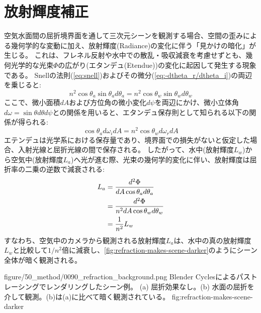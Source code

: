 \section{放射輝度補正}\label{sec:color-correction}


空気水面間の屈折境界面を通して三次元シーンを観測する場合、空間の歪みによる幾何学的な変動に加え、放射輝度(Radiance)の変化に伴う「見かけの暗化」が生じる。
これは、フレネル反射や水中での散乱・吸収減衰を考慮せずとも、幾何光学的な光束$\Phi$の広がり(エタンデュ(Etendue))の変化に起因して発生する現象である。
Snellの法則(\cref{eq:snell})およびその微分(\cref{eq:-dtheta_r/dtheta_i})の両辺を乗じると:
\begin{equation}
  n^2 \cos \theta_a \sin \theta_a d \theta_a = n^2 \cos \theta_w \sin \theta_w d \theta_w
\end{equation}
ここで、微小面積$dA$および方位角の微小変化$d\psi$を両辺にかけ、微小立体角$d\omega = \sin\theta d\theta d\psi$との関係を用いると、エタンデュ保存則\parencite{etendue}として知られる以下の関係が得られる:
\begin{equation}\label{eq:etendue_preservation}
  \cos\theta_a d\omega_i dA = n^2 \cos\theta_w d\omega_r dA
\end{equation}
エテンデュは光学系における保存量であり、境界面での損失がないと仮定した場合、入射光線と屈折光線の間で保存される。
したがって、水中(放射輝度$L_w$)から空気中(放射輝度$L_a$)へ光が進む際、光束の幾何学的変化に伴い、放射輝度は屈折率の二乗の逆数で減衰される:
\begin{align}\label{eq:radiance_between_air_and_water}
  L_a &= \frac{d^2 \Phi }{dA \cos\theta_a d\theta_a} \notag \\
      &= \frac{d^2 \Phi }{n^2 dA \cos\theta_w d\theta_w} \notag \\
      &= \frac{1}{n^2} L_w 
\end{align}
すなわち、空気中のカメラから観測される放射輝度$L_a$は、水中の真の放射輝度$L_w$と比較して$1/n^2$倍に減衰し、\cref{fig:refraction-makes-scene-darker}のようにシーン全体が暗く観測される。

  {figure/50_method/0090_refraction_background.png}{}
  {Blender Cyclesによるパストレーシングでレンダリングしたシーン例。
  (a) 屈折効果なし。(b) 水面の屈折を介して観測。(b)は(a)に比べて暗く観測されている。}
  {fig:refraction-makes-scene-darker}

